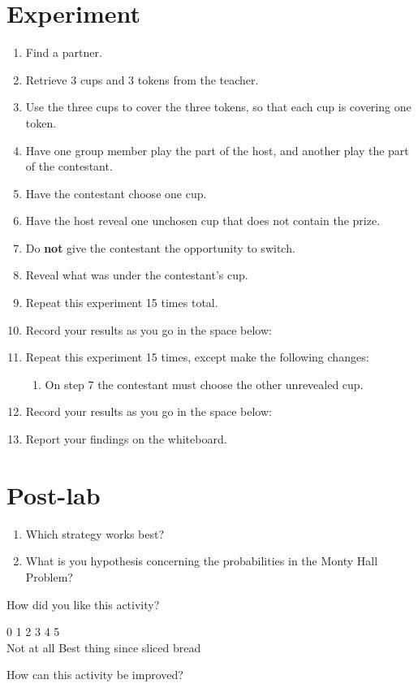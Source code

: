 \documentclass[11pt]{article}
\begin{document}
\section*{Experiment}
\begin{enumerate}
\item Find a partner.
\item Retrieve 3 cups and 3 tokens from the teacher.
\item Use the three cups to cover the three tokens, so that each cup is covering one token.
\item Have one group member play the part of the host, and another play the part of the contestant.
\item Have the contestant choose one cup.
\item Have the host reveal one unchosen cup that does not contain the prize.
\item Do \textbf{not} give the contestant the opportunity to switch.
\item Reveal what was under the contestant's cup.
\item Repeat this experiment 15 times total.
\item Record your results as you go in the space below:
\vspace{1in}
\item Repeat this experiment 15 times, except make the following changes:
\begin{enumerate}
\item On step 7 the contestant must choose the other unrevealed cup.
\end{enumerate}
\item Record your results as you go in the space below:
\vspace{1in}
\item Report your findings on the whiteboard.
\end{enumerate}
\section*{Post-lab}
\begin{enumerate}
\item Which strategy works best?
\item What is you hypothesis concerning the probabilities in the Monty Hall Problem?
\end{enumerate}
\vfill
How did you like this activity?
\par
0 \hfill 1 \hfill 2 \hfill 3 \hfill 4 \hfill 5\\
Not at all \hfill Best thing since sliced bread
\par
How can this activity be improved?
\end{document}
